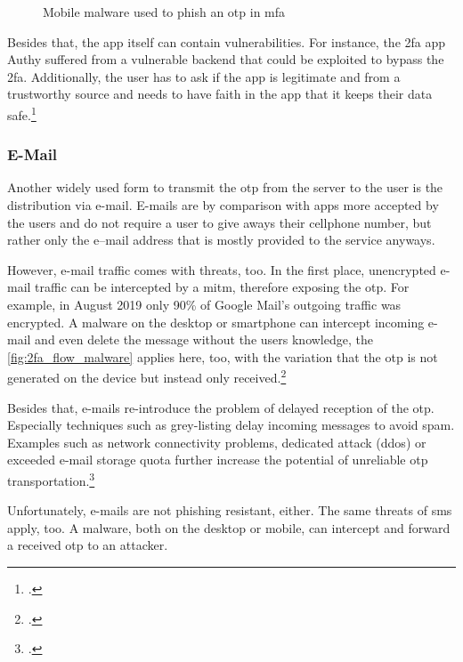  \newpage
 
 \begin{figure}[hbt]
	\centering
	
	\caption[Mobile malware used to phish an \gls{otp} in \gls{mfa}]{Mobile malware used to phish an \gls{otp} in \gls{mfa}\footnotemark}
	\label{fig:2fa_flow_malware}
\end{figure}
 
 Besides that, the app itself can contain vulnerabilities. For instance, the \gls{2fa} app Authy suffered from a vulnerable backend that could be exploited to bypass the \gls{2fa}. Additionally, the user has to ask if the app is legitimate and from a trustworthy source and needs to have faith in the app that it keeps their data safe.\footcites[See][]{eset-bypass2fa}[See][]{sakurity-authy}
 
\subsubsection{E-Mail}

Another widely used form to transmit the \gls{otp} from the server to the user is the distribution via e-mail. E-mails are by comparison with apps more accepted by the users and do not require a user to give aways their cellphone number, but rather only the e--mail address that is mostly provided to the service anyways.

However, e-mail traffic comes with threats, too. In the first place, unencrypted e-mail traffic can be intercepted by a \gls{mitm}, therefore exposing the \gls{otp}. For example, in August 2019 only 90\% of Google Mail's outgoing traffic was encrypted. A malware on the desktop or smartphone can intercept incoming e-mail and even delete the message without the users knowledge, the \autoref{fig:2fa_flow_malware} applies here, too, with the variation that the \gls{otp} is not generated on the device but instead only received.\footcites[See][]{email-encryption}

Besides that, e-mails re-introduce the problem of delayed reception of the \gls{otp}. Especially techniques such as grey-listing delay incoming messages to avoid spam. Examples such as network connectivity problems, dedicated attack (\gls{ddos}) or exceeded e-mail storage quota further increase the potential of unreliable \gls{otp} transportation.\footcites[See][]{rfc6647}

Unfortunately, e-mails are not phishing resistant, either. The same threats of \gls{sms} apply, too. A malware, both on the desktop or mobile, can intercept and forward a received \gls{otp} to an attacker.
